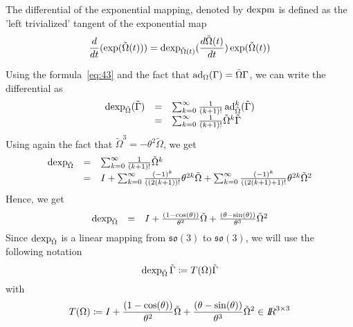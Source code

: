 
The differential of the exponential mapping, denoted by $\operatorname{dexpm}$ is defined as the 'left trivialized' tangent of the exponential map
\begin{equation}
  \label{eq:72}
   \frac{d}{dt} (\exp(\tilde \Omega(t))) = \operatorname{dexp}_{\tilde\Omega(t)}(\frac{d \tilde{\Omega}(t)}{dt}) \exp(\tilde\Omega(t))
\end{equation}

Using the formula~\eqref{eq:43} and the fact that $\operatorname{ad}_\Omega(\Gamma) = \Tilde\Omega \Gamma$, we can write the differential as
\begin{equation}
  \label{eq:122}
  \begin{array}{lcl}
    \operatorname{dexp}_{\tilde\Omega}(\tilde\Gamma) &=& \sum_{k=0}^\infty \frac{1}{(k+1)!} \operatorname{ad}_{\tilde \Omega}^k (\tilde\Gamma) \\
                                       &=& \sum_{k=0}^\infty \frac{1}{(k+1)!} \tilde\Omega^k \tilde \Gamma \\
  \end{array}
\end{equation}
Using again the fact that $\tilde\Omega^3 = -\theta^2 \tilde\Omega$, we get
\begin{equation}
  \label{eq:123}
   \begin{array}{lcl}
     \operatorname{dexp}_{\tilde\Omega} &=& \sum_{k=0}^\infty  \frac{1}{(k+1)!} \tilde\Omega^k \\
                          &=& I  + \sum_{k=0}^\infty  \frac{(-1)^k}{((2(k+1))!} \theta^{2k} \tilde\Omega + \sum_{k=0}^\infty  \frac{(-1)^k}{((2(k+1)+1)!} \theta^{2k} \tilde\Omega^2\\
  \end{array}
\end{equation}
Hence, we get
\begin{equation}
  \label{eq:124}
   \begin{array}{lcl}
     \operatorname{dexp}_{\tilde\Omega}  &=& I  + \frac{(1-\cos(\theta))}{\theta^2}\tilde\Omega + \frac{(\theta-\sin(\theta))}{\theta^3}\tilde\Omega^2 
  \end{array}
\end{equation}
Since $\operatorname{dexp}_{\tilde\Omega}$ is a linear mapping from $\mathfrak{so(3)}$ to $\mathfrak{so(3)}$, we will use the following notation
\begin{equation}
  \label{eq:172}
  \operatorname{dexp}_{\tilde\Omega}\tilde\Gamma  \coloneqq T(\Omega)\tilde\Gamma 
\end{equation}
with
\begin{equation}
  \label{eq:173}
   T(\Omega) \coloneqq I  + \frac{(1-\cos(\theta))}{\theta^2}\tilde\Omega + \frac{(\theta-\sin(\theta))}{\theta^3}\tilde\Omega^2  \in \mbox{\rm $I\!\!R$}^{3\times 3}
\end{equation}

